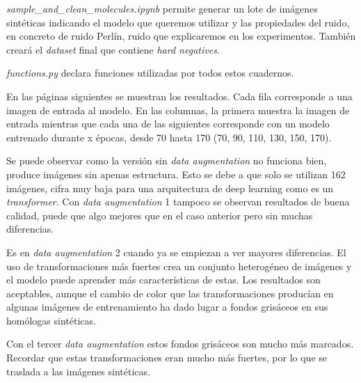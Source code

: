 \noindent \textit{sample\_and\_clean\_molecules.ipynb}  permite generar un lote de imágenes sintéticas indicando el modelo que queremos utilizar y las propiedades del ruido, en concreto de ruido Perlín, ruido que explicaremos en los experimentos. También creará el \textit{dataset} final que contiene \textit{hard negatives}.

\noindent \textit{functions.py} declara funciones utilizadas por todos estos cuadernos.

\newpage
En las páginas siguientes se muestran los resultados. Cada fila corresponde a una imagen de entrada al modelo. En las columnas, la primera muestra la imagen de entrada mientras que cada una de las siguientes corresponde con un modelo entrenado durante x épocas, desde 70 hasta 170 (70, 90, 110, 130, 150, 170).

Se puede observar como la versión sin \textit{data augmentation} no funciona bien, produce imágenes sin apenas estructura. Esto se debe a que solo se utilizan 162 imágenes, cifra muy baja para una arquitectura de deep learning como es un \textit{transformer}. Con \textit{data augmentation} 1 tampoco se observan resultados de buena calidad, puede que algo mejores que en el caso anterior pero sin muchas diferencias.

Es en \textit{data augmentation} 2 cuando ya se empiezan a ver mayores diferencias. El uso de transformaciones más fuertes crea un conjunto heterogéneo de imágenes y el modelo puede aprender más características de estas. Los resultados son aceptables, aunque el cambio de color que las transformaciones producían en algunas imágenes de entrenamiento ha dado lugar a fondos grisáceos en sus homólogas sintéticas. 

Con el tercer \textit{data augmentation} estos fondos grisáceos son mucho más marcados. Recordar que estas transformaciones eran mucho más fuertes, por lo que se traslada a las imágenes sintéticas.


